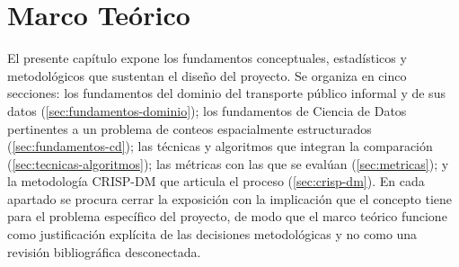 %
\chapter{Marco Teórico}
\label{cap:marco-teorico}

El presente capítulo expone los fundamentos conceptuales, estadísticos y metodológicos que
sustentan el diseño del proyecto. Se organiza en cinco secciones: los fundamentos del dominio
del transporte público informal y de sus datos (\ref{sec:fundamentos-dominio}); los
fundamentos de Ciencia de Datos pertinentes a un problema de conteos espacialmente
estructurados (\ref{sec:fundamentos-cd}); las técnicas y algoritmos que integran la
comparación (\ref{sec:tecnicas-algoritmos}); las métricas con las que se evalúan
(\ref{sec:metricas}); y la metodología CRISP-DM que articula el proceso
(\ref{sec:crisp-dm}). En cada apartado se procura cerrar la exposición con la implicación
que el concepto tiene para el problema específico del proyecto, de modo que el marco teórico
funcione como justificación explícita de las decisiones metodológicas y no como una revisión
bibliográfica desconectada.






